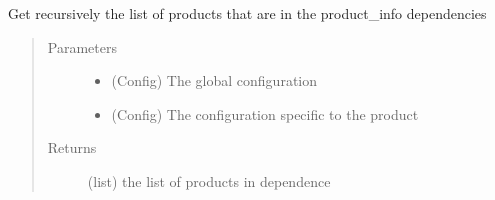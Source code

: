 \documentclass[a4paper,10pt,english]{sphinxmanual}
\begin{document}
\begin{fulllineitems}
\label{\detokenize{apidoc_src/src:src.product.get_product_dependencies}}
Get recursively the list of products that are 
in the product\_info dependencies
\begin{quote}\begin{description}
\item[{Parameters}] \leavevmode\begin{itemize}
\item {} 
 \textendash{} (Config) The global configuration

\item {} 
 \textendash{} (Config) 
The configuration specific to the product

\end{itemize}

\item[{Returns}] \leavevmode
(list) the list of products in dependence

\end{description}\end{quote}

\end{fulllineitems}

\end{document}
